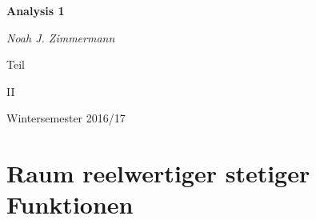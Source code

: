 \documentclass[headsepline,12pt,a4paper]{scrartcl}
\begin{document}
\begin{titlepage}
	\centering
	{\huge\bfseries Analysis 1\par}
	\vspace{2cm}
	{\Large\itshape Noah J. Zimmermann\par}
	\vfill
	Teil\par
	 \textsc{II}

	\vfill

	{\large Wintersemester 2016/17\par}
\end{titlepage}

\tableofcontents

\newpage

\section*{Raum reelwertiger stetiger Funktionen}
\end{document}
